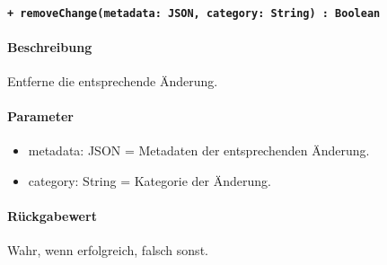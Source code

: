 \paragraph{\texttt{+ removeChange(metadata: JSON, category: String) : Boolean}}\label{AP_Framework_removeChange}%
\paragraph*{Beschreibung}
Entferne die entsprechende Änderung.
\paragraph*{Parameter}
\begin{itemize}
    \item metadata: JSON = Metadaten der entsprechenden Änderung.
    \item category: String = Kategorie der Änderung.
\end{itemize}
\paragraph*{Rückgabewert}
Wahr, wenn erfolgreich, falsch sonst.